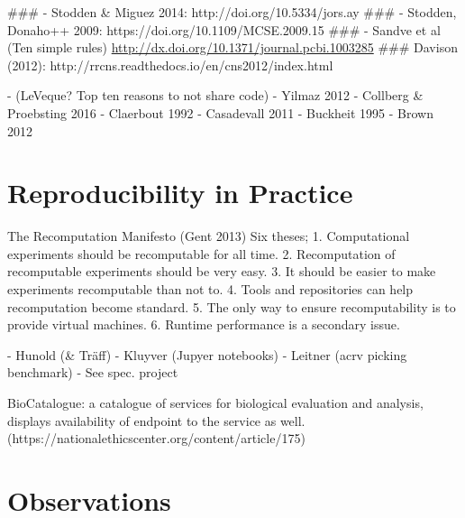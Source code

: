 ### - Stodden & Miguez 2014: http://doi.org/10.5334/jors.ay
### - Stodden, Donaho++ 2009: https://doi.org/10.1109/MCSE.2009.15
### - Sandve et al (Ten simple rules) \url{http://dx.doi.org/10.1371/journal.pcbi.1003285}
### Davison (2012): http://rrcns.readthedocs.io/en/cns2012/index.html

- (LeVeque? Top ten reasons to not share code)
- Yilmaz 2012
- Collberg & Proebsting 2016
- Claerbout 1992
- Casadevall 2011
- Buckheit 1995
- Brown 2012

\section{Reproducibility in Practice}

The Recomputation Manifesto (Gent 2013)
Six theses; 1. Computational experiments should be recomputable for all time. 2. Recomputation of recomputable experiments should be very easy. 3. It should be easier to make experiments recomputable than not to. 4. Tools and repositories can help recomputation become standard. 5. The only way to ensure recomputability is to provide virtual machines. 6. Runtime performance is a secondary issue.

- Hunold (& Träff)
- Kluyver (Jupyer notebooks)
- Leitner (acrv picking benchmark)
- See spec. project

BioCatalogue: a catalogue of services for biological evaluation and analysis, displays availability of endpoint to the service as well. (https://nationalethicscenter.org/content/article/175)


\section{Observations}

\cleardoublepage
